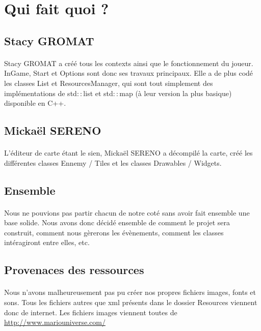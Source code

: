 ﻿\section{Qui fait quoi ?}

\subsection{Stacy GROMAT}
\paragraph{} Stacy GROMAT a créé tous les contexts ainsi que le fonctionnement du joueur. InGame, Start et Options sont donc ses travaux principaux. Elle a de plus codé les classes List et ResourcesManager, qui sont tout simplement des implémentations de std$::$list et std$::$map (à leur version la plus basique) disponible en C++. 

\subsection{Mickaël SERENO}
\paragraph{} L'éditeur de carte étant le sien, Mickaël SERENO a décompilé la carte, créé les différentes classes Ennemy / Tiles et les classes Drawables / Widgets.

\subsection{Ensemble}
\paragraph{} Nous ne pouvions pas partir chacun de notre coté sans avoir fait ensemble une base solide. Nous avons donc décidé ensemble de comment le projet sera construit, comment nous gèrerons les évènements, comment les classes intéragiront entre elles, etc.

\subsection{Provenaces des ressources}
\paragraph{} Nous n'avons malheureusement pas pu créer nos propres fichiers images, fonts et sons. Tous les fichiers autres que xml présents dans le dossier Resources viennent donc de internet. Les fichiers images viennent toutes de \url{http://www.mariouniverse.com/} 
